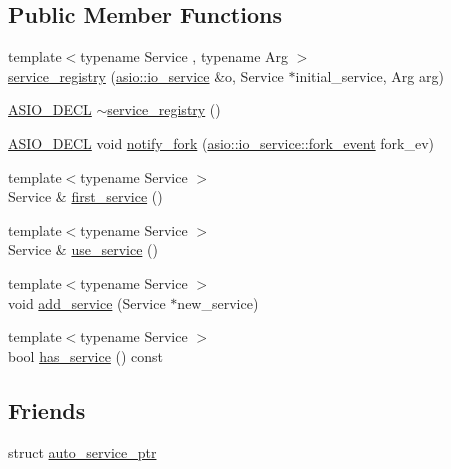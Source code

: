 \subsection*{Public Member Functions}
\begin{DoxyCompactItemize}
\item 
{\footnotesize template$<$typename Service , typename Arg $>$ }\\\hyperlink{classasio_1_1detail_1_1service__registry_acb3f3804b0f51a817a32481f326be6a6}{service\+\_\+registry} (\hyperlink{classasio_1_1io__service}{asio\+::io\+\_\+service} \&o, Service $\ast$initial\+\_\+service, Arg arg)
\item 
\hyperlink{config_8hpp_ab54d01ea04afeb9a8b39cfac467656b7}{A\+S\+I\+O\+\_\+\+D\+E\+C\+L} \hyperlink{classasio_1_1detail_1_1service__registry_a0741dc07d5a23ea3a8bdfc055862756f}{$\sim$service\+\_\+registry} ()
\item 
\hyperlink{config_8hpp_ab54d01ea04afeb9a8b39cfac467656b7}{A\+S\+I\+O\+\_\+\+D\+E\+C\+L} void \hyperlink{classasio_1_1detail_1_1service__registry_a6cc5579aa9e5d251a7fb885c275bd0eb}{notify\+\_\+fork} (\hyperlink{classasio_1_1io__service_a45f084ae64e601f7ead3f891d5ed0fc6}{asio\+::io\+\_\+service\+::fork\+\_\+event} fork\+\_\+ev)
\item 
{\footnotesize template$<$typename Service $>$ }\\Service \& \hyperlink{classasio_1_1detail_1_1service__registry_a04a8bdb8f87ade5a4f188a0bbc58a146}{first\+\_\+service} ()
\item 
{\footnotesize template$<$typename Service $>$ }\\Service \& \hyperlink{classasio_1_1detail_1_1service__registry_a5a242a3cc450e33376ea1ef156a787d3}{use\+\_\+service} ()
\item 
{\footnotesize template$<$typename Service $>$ }\\void \hyperlink{classasio_1_1detail_1_1service__registry_a770edbfcb15b3888f50a6481729318ec}{add\+\_\+service} (Service $\ast$new\+\_\+service)
\item 
{\footnotesize template$<$typename Service $>$ }\\bool \hyperlink{classasio_1_1detail_1_1service__registry_a1789ac24febc0eb8625fd4ebc9014616}{has\+\_\+service} () const 
\end{DoxyCompactItemize}
\subsection*{Friends}
\begin{DoxyCompactItemize}
\item 
struct \hyperlink{classasio_1_1detail_1_1service__registry_a64b74d68589accc1f2296e4e9ebe0994}{auto\+\_\+service\+\_\+ptr}
\end{DoxyCompactItemize}


